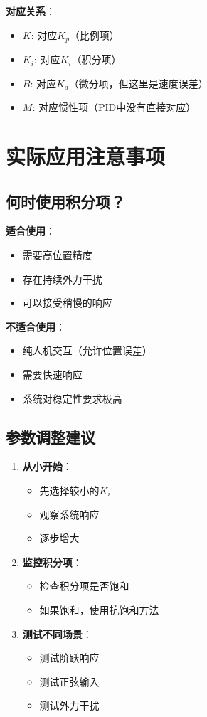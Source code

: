 \documentclass[12pt,a4paper]{article}
\begin{document}
\textbf{对应关系}：
\begin{itemize}
\item $K$: 对应$K_p$（比例项）
\item $K_i$: 对应$K_i$（积分项）
\item $B$: 对应$K_d$（微分项，但这里是速度误差）
\item $M$: 对应惯性项（PID中没有直接对应）
\end{itemize}

\section{实际应用注意事项}

\subsection{何时使用积分项？}

\textbf{适合使用}：
\begin{itemize}
\item 需要高位置精度
\item 存在持续外力干扰
\item 可以接受稍慢的响应
\end{itemize}

\textbf{不适合使用}：
\begin{itemize}
\item 纯人机交互（允许位置误差）
\item 需要快速响应
\item 系统对稳定性要求极高
\end{itemize}

\subsection{参数调整建议}

\begin{enumerate}
\item \textbf{从小开始}：
\begin{itemize}
\item 先选择较小的$K_i$
\item 观察系统响应
\item 逐步增大
\end{itemize}

\item \textbf{监控积分项}：
\begin{itemize}
\item 检查积分项是否饱和
\item 如果饱和，使用抗饱和方法
\end{itemize}

\item \textbf{测试不同场景}：
\begin{itemize}
\item 测试阶跃响应
\item 测试正弦输入
\item 测试外力干扰
\end{itemize}
\end{enumerate}
\end{document}
